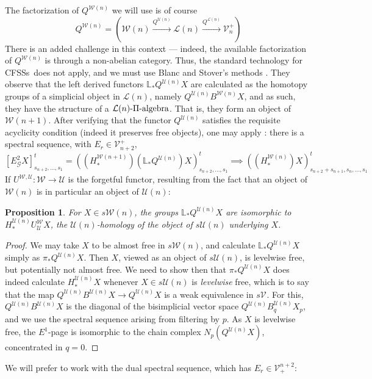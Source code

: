 \documentclass[11pt]{amsart} \renewcommand{\baselinestretch}{1.2}
\theoremstyle{plain}
\newtheorem{prop}[thm]{Proposition}
\numberwithin{equation}{section} %
\theoremstyle{plain}
\newtheorem{prop}[thm]{Proposition}
\numberwithin{equation}{chapter} %
\renewcommand{\to}{\longrightarrow}
\newcommand{\scrG}{\mathscr{G}}
\newcommand{\calU}{\mathcal{U}}
\newcommand{\calL}{\mathcal{L}}
\newcommand{\calV}{\mathcal{V}}
\newcommand{\calw}{\mathcal{W}}
\newcommand{\vect}[2]{\calV^{#1}_{#2}}
\newcommand{\BSW}{{\scrG}}
\newcommand{\E}[5]{[E^{#1}_{#2}#3]^{#4}_{#5}}
\newcommand{\CFSSs}{CFSSs}
\begin{document}
\begin{Comp funct sseqs}
The factorization of $Q^{\calw(n)}$ we will use is of course 
\[Q^{\calw(n)}=\left(\calw(n)\overset{Q^{\calU(n)}}{\to}\calL(n)\overset{Q^{\calL(n)}}{\to}\vect{+}{n}\right)\]
There is an added challenge in this context --- indeed, the available factorization of $Q^{\calw(n)}$ is through a non-abelian category. Thus, the standard technology for \CFSSs\ does not apply, and we must use Blanc and Stover's methods \cite{Blanc_Stover-Groth_SS.pdf}. They observe that the left derived functors $\mathbb{L}_*Q^{\calU(n)}X$ are calculated as the homotopy groups of a simplicial object in $\calL(n)$, namely $Q^{\calU(n)}B^{\calw(n)}X$, and as such, they have the structure of a $\calL(n)\textup{-$\Pi$-algebra}$. That is, they form an object of $\calw(n+1)$.  After verifying that the functor $Q^{\calU(n)}$ satisfies the requisite acyclicity condition (indeed it preserves free objects), one may apply \cite[Theorem 4.4]{Blanc_Stover-Groth_SS.pdf}: there is a spectral sequence, with $E_r\in\vect{+}{n+2}$,
\[\E{2}{\BSW}{X}{t}{s_{n+2},\ldots,s_1}=((H_*^{\calw(n+1)})(\mathbb{L}_*Q^{\calU(n)})X)_{s_{n+2},\ldots,s_1}^t\implies ((H_*^{\calw(n)})X)_{s_{n+2}+s_{n+1},s_n,\ldots,s_1}^t\]
If $U^{\calw,\calU}:\calw\to\calU$ is the forgetful functor, resulting from the fact that an object of $\calw(n)$ is in particular an object of $\calU(n)$:
\begin{prop}
\label{what is LQU, dude?}
For $X\in s\calw(n)$, the groups $\mathbb{L}_*Q^{\calU(n)}X$ are isomorphic to $H_*^{\calU(n)}U^{\calw}_{\calU}X$, the $\calU(n)$-homology of the object of $s\calU(n)$ underlying $X$.
\end{prop}
\begin{proof}
We may take $X$ to be almost free in $s\calw(n)$, and calculate $\mathbb{L}_*Q^{\calU(n)}X$ simply as $\pi_*Q^{\calU(n)}X$. Then $X$, viewed as an object of $s\calU(n)$, is levelwise free, but potentially not almost free. We need to show then that $\pi_*Q^{\calU(n)}X$ does indeed calculate $H_*^{\calU(n)}X$ whenever $X\in s\calU(n)$ is \emph{levelwise} free, which is to say that the map $Q^{\calU(n)}B^{\calU(n)}X\to Q^{\calU(n)}X$ is a weak equivalence in $s\vect{}{}$. For this, $Q^{\calU(n)}B^{\calU(n)}X$ is the diagonal of the bisimplicial vector space $Q^{\calU(n)}B_q^{\calU(n)}X_p$, and we use the spectral sequence arising from filtering by $p$. As $X$ is levelwise free, the $E^1$-page is isomorphic to the chain complex $N_p(Q^{\calU(n)}X)$, concentrated in $q=0$.
\end{proof}
We will prefer to work with the dual spectral sequence, which has $E_r\in\vect{n+2}{+}$:

\end{Comp funct sseqs}
\end{document}
